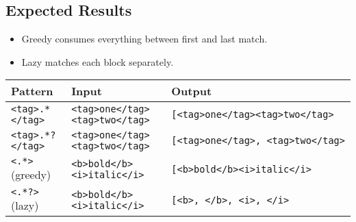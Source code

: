 \documentclass[
  letterpaper,
  DIV=11,
  numbers=noendperiod]{scrreprt}
\providecommand{\tightlist}{%
  \setlength{\itemsep}{0pt}\setlength{\parskip}{0pt}}
\begin{document}
\subsection{Expected Results}\label{expected-results-11}

\begin{itemize}
\tightlist
\item
  Greedy consumes everything between first and last match.
\item
  Lazy matches each block separately.
\end{itemize}

\begin{longtable}[]{@{}
  >{\raggedright\arraybackslash}p{}
  >{\raggedright\arraybackslash}p{}
  >{\raggedright\arraybackslash}p{}@{}}
\toprule\noalign{}
\begin{minipage}[b]{\linewidth}\raggedright
Pattern
\end{minipage} & \begin{minipage}[b]{\linewidth}\raggedright
Input
\end{minipage} & \begin{minipage}[b]{\linewidth}\raggedright
Output
\end{minipage} \\
\midrule\noalign{}
\endhead
\bottomrule\noalign{}
\endlastfoot
\texttt{\textless{}tag\textgreater{}.*\textless{}/tag\textgreater{}} &
\texttt{\textless{}tag\textgreater{}one\textless{}/tag\textgreater{}\textless{}tag\textgreater{}two\textless{}/tag\textgreater{}}
&
\texttt{{[}\textquotesingle{}\textless{}tag\textgreater{}one\textless{}/tag\textgreater{}\textless{}tag\textgreater{}two\textless{}/tag\textgreater{}\textquotesingle{}{]}} \\
\texttt{\textless{}tag\textgreater{}.*?\textless{}/tag\textgreater{}} &
\texttt{\textless{}tag\textgreater{}one\textless{}/tag\textgreater{}\textless{}tag\textgreater{}two\textless{}/tag\textgreater{}}
&
\texttt{{[}\textquotesingle{}\textless{}tag\textgreater{}one\textless{}/tag\textgreater{}\textquotesingle{},\ \textquotesingle{}\textless{}tag\textgreater{}two\textless{}/tag\textgreater{}\textquotesingle{}{]}} \\
\texttt{\textless{}.*\textgreater{}} (greedy) &
\texttt{\textless{}b\textgreater{}bold\textless{}/b\textgreater{}\textless{}i\textgreater{}italic\textless{}/i\textgreater{}}
&
\texttt{{[}\textquotesingle{}\textless{}b\textgreater{}bold\textless{}/b\textgreater{}\textless{}i\textgreater{}italic\textless{}/i\textgreater{}\textquotesingle{}{]}} \\
\texttt{\textless{}.*?\textgreater{}} (lazy) &
\texttt{\textless{}b\textgreater{}bold\textless{}/b\textgreater{}\textless{}i\textgreater{}italic\textless{}/i\textgreater{}}
&
\texttt{{[}\textquotesingle{}\textless{}b\textgreater{}\textquotesingle{},\ \textquotesingle{}\textless{}/b\textgreater{}\textquotesingle{},\ \textquotesingle{}\textless{}i\textgreater{}\textquotesingle{},\ \textquotesingle{}\textless{}/i\textgreater{}\textquotesingle{}{]}} \\
\end{longtable}
\end{document}
